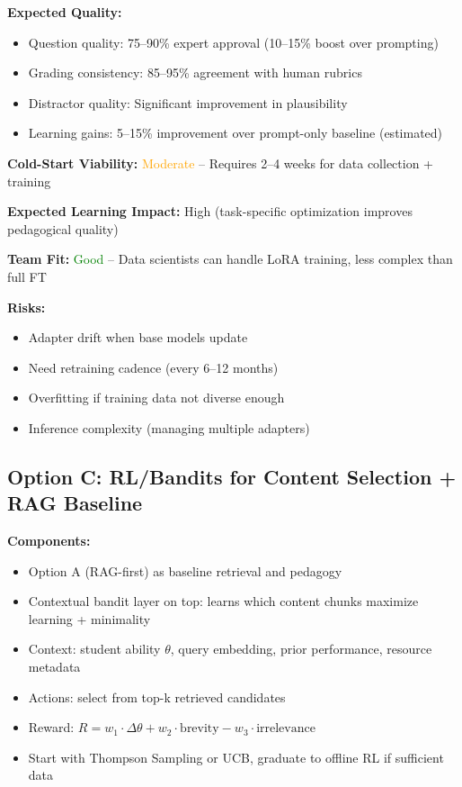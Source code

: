 \documentclass[11pt,letterpaper]{article}
\begin{document}
\textbf{Expected Quality:}
\begin{itemize}
\item Question quality: 75--90\% expert approval (10--15\% boost over prompting)
\item Grading consistency: 85--95\% agreement with human rubrics
\item Distractor quality: Significant improvement in plausibility
\item Learning gains: 5--15\% improvement over prompt-only baseline (estimated)
\end{itemize}

\textbf{Cold-Start Viability:} \textcolor{orange}{Moderate} -- Requires 2--4 weeks for data collection + training

\textbf{Expected Learning Impact:} High (task-specific optimization improves pedagogical quality)

\textbf{Team Fit:} \textcolor{green}{Good} -- Data scientists can handle LoRA training, less complex than full FT

\textbf{Risks:}
\begin{itemize}
\item Adapter drift when base models update
\item Need retraining cadence (every 6--12 months)
\item Overfitting if training data not diverse enough
\item Inference complexity (managing multiple adapters)
\end{itemize}

\subsection{Option C: RL/Bandits for Content Selection + RAG Baseline}

\textbf{Components:}
\begin{itemize}
\item Option A (RAG-first) as baseline retrieval and pedagogy
\item Contextual bandit layer on top: learns which content chunks maximize learning + minimality
\item Context: student ability $\theta$, query embedding, prior performance, resource metadata
\item Actions: select from top-k retrieved candidates
\item Reward: $R = w_1 \cdot \Delta\theta + w_2 \cdot \text{brevity} - w_3 \cdot \text{irrelevance}$
\item Start with Thompson Sampling or UCB, graduate to offline RL if sufficient data
\end{itemize}
\end{document}
